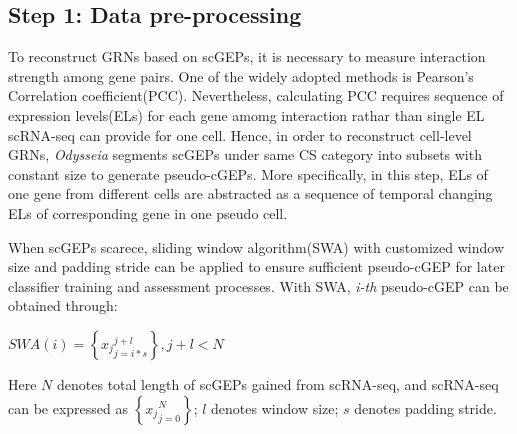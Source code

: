 \documentclass[fleqn,10pt]{wlscirep}
\begin{document}
\subsection*{Step 1: Data pre-processing}
\label{step1}
To reconstruct GRNs based on scGEPs, it is necessary to measure interaction strength among gene pairs.
One of the widely adopted methods is Pearson's Correlation coefficient(PCC)\cite{cid_2019, pcc_2012}.
Nevertheless, calculating PCC requires sequence of expression levels(ELs) for each gene amomg interaction rathar than single EL scRNA-seq can provide for one cell.
Hence, in order to reconstruct cell-level GRNs, \emph{Odysseia} segments scGEPs under same CS category into subsets with constant size to generate pseudo-cGEPs.
More specifically, in this step, ELs of one gene from different cells are abstracted as a sequence of temporal changing ELs of corresponding gene in one pseudo cell.

When scGEPs scarece, sliding window algorithm(SWA) with customized window size and padding stride can be applied to ensure sufficient pseudo-cGEP for later classifier training and assessment processes.
With SWA, \emph{i-th} pseudo-cGEP can be obtained through:

\centerline{$SWA(i) = \left\{{x_j}_{j = i * s}^{j + l}\right\}, j + l < N$}
Here $N$ denotes total length of scGEPs gained from scRNA-seq, and scRNA-seq can be expressed as $\left\{{x_j}_{j = 0}^{N}\right\}$; $l$ denotes window size; $s$ denotes padding stride.
\end{document}
